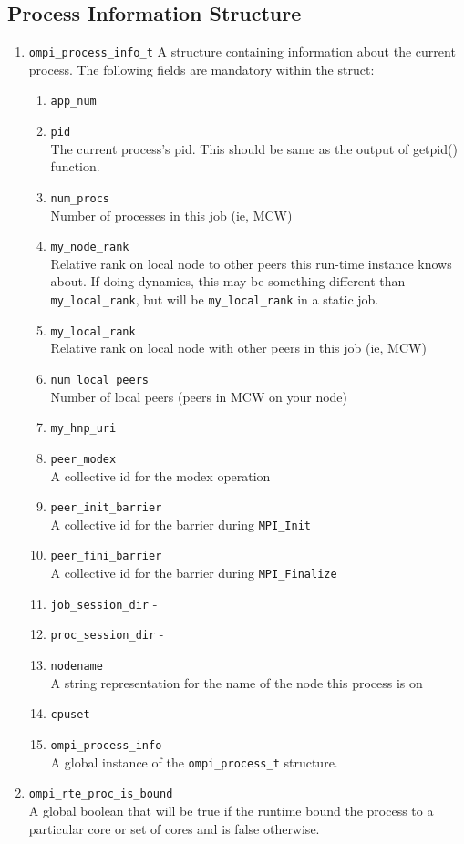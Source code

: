 \subsection{Process Information Structure}
\begin{enumerate}
\item \verb|ompi_process_info_t|
  A structure containing information about the current process. The following fields are mandatory within the struct:
  \begin{enumerate}
  \item \verb|app_num|
  \item \verb|pid|\\
    The current process's pid. This should be same as the output of getpid() function.
  \item \verb|num_procs|\\
    Number of processes in this job (ie, MCW)
  \item \verb|my_node_rank|\\
    Relative rank on local node to other peers this run-time instance knows about.  If doing dynamics, this may be something different than \verb|my_local_rank|, but will be \verb|my_local_rank| in a static job.
  \item \verb|my_local_rank|\\
    Relative rank on local node with other peers in this job (ie, MCW)
  \item \verb|num_local_peers|\\
    Number of local peers (peers in MCW on your node)
  \item \verb|my_hnp_uri|
  \item \verb|peer_modex| \\
    A collective id for the modex operation
  \item \verb|peer_init_barrier| \\
    A collective id for the barrier during \verb|MPI_Init|
  \item \verb|peer_fini_barrier| \\
    A collective id for the barrier during \verb|MPI_Finalize|
  \item \verb|job_session_dir| -
  \item \verb|proc_session_dir| -
  \item \verb|nodename| \\
    A string representation for the name of the node this process is on
  \item \verb|cpuset|
  \item \verb|ompi_process_info| \\
    A global instance of the \verb|ompi_process_t| structure.
  \end{enumerate}
  
\item \verb|ompi_rte_proc_is_bound|\\
  A global boolean that will be true if the runtime bound the process to a particular core or set of cores and is false otherwise.
\end{enumerate}

